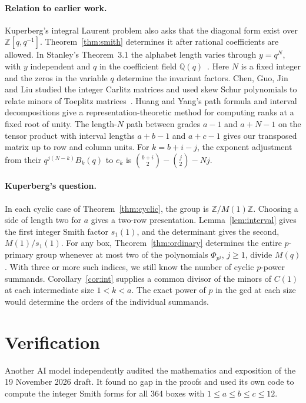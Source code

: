 \documentclass[11pt]{article}
\newcommand{\Z}{\mathbb Z}
\newcommand{\Q}{\mathbb Q}
\begin{document}
\paragraph{Relation to earlier work.}
Kuperberg's integral Laurent problem also asks that the diagonal form
exist over \(\Z[q,q^{-1}]\). Theorem~\ref{thm:smith} determines it
after rational coefficients are allowed. In Stanley's Theorem~3.1
the alphabet length varies through \(y=q^N\), with \(y\)
independent and \(q\) in the coefficient field
\(\Q(q)\)~\cite{Stanley}. Here \(N\) is a fixed integer and the zeros
in the variable \(q\) determine the invariant factors. Chen, Guo, Jin
and Liu studied the integer Carlitz matrices and used skew Schur
polynomials to relate minors of Toeplitz matrices~\cite{CGJL}.
Huang and Yang's path formula and interval decompositions
\cite[\S\S4.2, 4.4]{HY} give a representation-theoretic method for
computing ranks at a fixed root of unity.
The length-\(N\) path between grades \(a-1\)
and \(a+N-1\) on the tensor product with interval lengths \(a+b-1\) and
\(a+c-1\) gives our transposed matrix up to row and column units.
For \(k=b+i-j\), the exponent adjustment from their
\(q^{j(N-k)}B_k(q)\) to \(e_k\) is
\(\binom{b+i}{2}-\binom j2-Nj\).

\paragraph{Kuperberg's question.}
In each cyclic case of Theorem~\ref{thm:cyclic}, the group is
\(\Z/M(1)\Z\). Choosing a side of length two for \(a\) gives a two-row
presentation. Lemma~\ref{lem:interval} gives the first integer Smith factor
\(s_1(1)\), and the determinant gives the second, \(M(1)/s_1(1)\).
For any box, Theorem~\ref{thm:ordinary} determines the entire
\(p\)-primary group whenever at most two of the polynomials
\(\Phi_{p^j}\), \(j\ge1\), divide \(M(q)\). With three or more such
indices, we still know the number of cyclic \(p\)-power summands.
Corollary~\ref{cor:int} supplies a common divisor of the minors of
\(C(1)\) at each intermediate size \(1<k<a\). The exact power of \(p\)
in the gcd at each size would determine the orders of the individual summands.

\section*{Verification}
Another AI model independently audited the mathematics and exposition of the
19 November 2026 draft. It found no gap in the proofs and used its own code
to compute the integer Smith forms for all 364 boxes with
\(1\le a\le b\le c\le12\).
\end{document}
